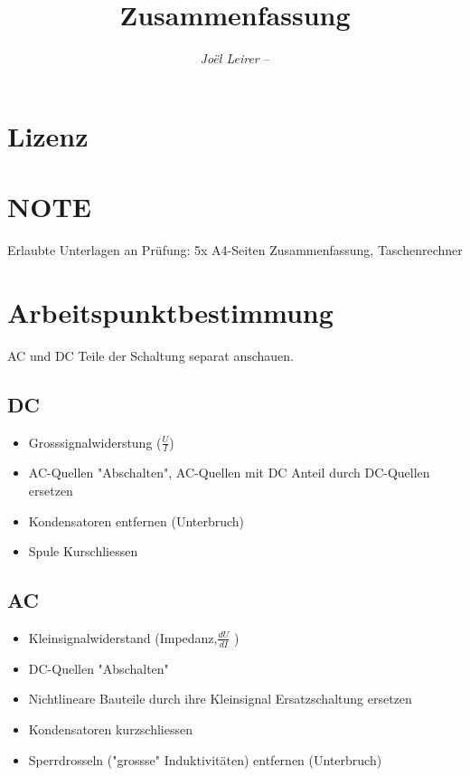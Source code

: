 \documentclass[margin=normal]{tex/hsrzf}
\author{\textsl{Joël Leirer} -- \texttt{\theauthoremail}}
\title{\texttt{\themodule} Zusammenfassung}
\date{\thesemester}
\begin{document}

\maketitle



\section*{Lizenz}
\doclicenseThis

\clearpage
\tableofcontents

\clearpage
\setcounter{page}{1}

\section*{NOTE}
Erlaubte Unterlagen an Prüfung: 5x A4-Seiten Zusammenfassung, Taschenrechner
\section{Arbeitspunktbestimmung}
AC und DC Teile der Schaltung separat anschauen.
\begin{multicols}{2}

  \subsection{DC}
  \begin{itemize}
    \item Grosssignalwiderstung ($\frac{U}{I}$)
    \item AC-Quellen "Abschalten", AC-Quellen mit DC Anteil durch DC-Quellen ersetzen
    \item Kondensatoren entfernen (Unterbruch)
    \item Spule Kurschliessen
  \end{itemize}
  \subsection{AC}
  \begin{itemize}
    \item Kleinsignalwiderstand (Impedanz,$\frac{dU}{dI}$ )
    \item DC-Quellen "Abschalten"
    \item Nichtlineare Bauteile durch ihre Kleinsignal Ersatzschaltung ersetzen
    \item Kondensatoren kurzschliessen
    \item Sperrdrosseln ("grossse" Induktivitäten) entfernen (Unterbruch)
  \end{itemize}
\end{multicols}
\end{document}
